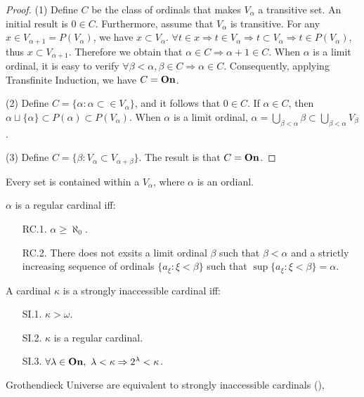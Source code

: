 \begin{proof}
  (1) Define $C$ be the class of ordinals that makes $V_{\alpha}$ a transitive set. An initial result is $0 \in C$. Furthermore, assume that $V_{\alpha}$ is transitive. For any $x \in V_{\alpha+1} = P(V_{\alpha})$, we have $x \subset V_{\alpha}$. $\forall t \in x \Rightarrow t \in V_{\alpha} \Rightarrow t \subset V_{\alpha} \Rightarrow t \in P(V_{\alpha})$, thus $x \subset V_{\alpha+1}$. Therefore we obtain that $\alpha \in C \Rightarrow \alpha + 1\in C$. When $\alpha$ is a limit ordinal, it is easy to verify $\forall \beta < \alpha , \beta \in C \Rightarrow \alpha \in C$. Consequently, applying Transfinite Induction, we have $C = \boldsymbol{\mathrm{On}}$. 

  (2) Define $C = \{ \alpha: \alpha \subset \in V_{\alpha}  \}$, and it follows that $0 \in C$. If $\alpha \in C$, then $\alpha \sqcup \{ \alpha \} \subset P(\alpha) \subset P(V_{\alpha})$. When $\alpha$ is a limit ordinal, $\alpha = \bigcup_{\beta < \alpha} \beta \subset \bigcup_{\beta < \alpha} V_{\beta}$.


  (3) Define $C = \{ \beta: V_{\alpha} \subset V_{\alpha+\beta} \}$. The result is that $C = \boldsymbol{\mathrm{On}}$.
\end{proof}




\begin{theorem}
  Every set is contained within a $V_{\alpha}$, where $\alpha$ is an ordianl. 
\end{theorem}




\begin{definition}
  $\alpha$ is a regular cardinal iff:
  \begin{enumerate}
    \item[RC.1.] $\alpha \geq \aleph_0$.
    \item[RC.2.] There does not exsits a limit ordinal $\beta$ such that $\beta < \alpha$ and a strictly increasing sequence of ordinals $\{ a_{\xi}: \xi < \beta \}$ such that $\sup \{ a_{\xi}: \xi < \beta \} = \alpha$.
  \end{enumerate}
\end{definition}




\begin{definition}
  A cardinal $\kappa$ is a strongly inaccessible cardinal iff:
  \begin{enumerate}
    \item[SI.1.] $\kappa > \omega$.
    \item[SI.2.] $\kappa$ is a regular cardinal.
    \item[SI.3.] $\forall \lambda \in \boldsymbol{\mathrm{On}},\  \lambda < \kappa \Rightarrow 2^{\lambda} < \kappa$.  
  \end{enumerate}
\end{definition}



Grothendieck Universe are equivalent to strongly inaccessible cardinals (\cite{GU_WIKI}),